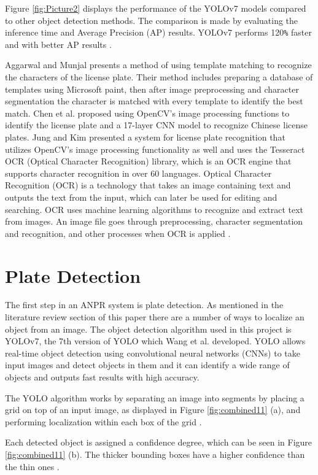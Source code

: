 \documentclass[conference]{IEEEtran}
\begin{document}
Figure \ref{fig:Picture2} displays the performance of the YOLOv7 models compared to other object detection methods. The comparison is made by evaluating the inference time and Average Precision (AP) results. YOLOv7 performs 120\verb|%| faster and with better AP results \cite{b6}.

Aggarwal and Munjal \cite{b7} presents a method of using template matching to recognize the characters of the license plate. Their method includes preparing a database of templates using Microsoft paint, then after image preprocessing and character segmentation the character is matched with every template to identify the best match. Chen et al. \cite{b8} proposed using OpenCV’s image processing functions to identify the license plate and a 17-layer CNN model to recognize Chinese license plates. Jung and Kim \cite{b9} presented a system for license plate recognition that utilizes OpenCV’s image processing functionality as well and uses the Tesseract OCR (Optical Character Recognition) library, which is an OCR engine that supports character recognition in over 60 languages.  Optical Character Recognition (OCR) is a technology that takes an image containing text and outputs the text from the input, which can later be used for editing and searching. OCR uses machine learning algorithms to recognize and extract text from images. An image file goes through preprocessing, character segmentation and recognition, and other processes when OCR is applied \cite{b10}. 


\section{Plate Detection}

The first step in an ANPR system is plate detection. As mentioned in the literature review section of this paper there are a number of ways to localize an object from an image. The object detection algorithm used in this project is YOLOv7, the 7th version of YOLO which Wang et al. \cite{b6} developed. YOLO allows real-time object detection using convolutional neural networks (CNNs) to take input images and detect objects in them and it can identify a wide range of objects and outputs fast results with high accuracy. 

The YOLO algorithm works by separating an image into segments by placing a grid on top of an input image, as displayed in Figure \ref{fig:combined11} (a), and performing localization within each box of the grid \cite{b24}.  

Each detected object is assigned a confidence degree, which can be seen in Figure \ref{fig:combined11} (b). The thicker bounding boxes have a higher confidence than the thin ones \cite{b24}. 
\end{document}
